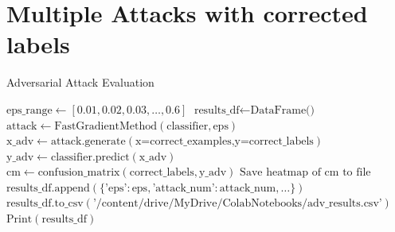 \documentclass[11pt,onside]{article}
\begin{document}
\section{Multiple Attacks with corrected labels}
\begin{algorithm}[H]
\caption{Adversarial Attack Evaluation}
\begin{algorithmic}[1]
\State $\text{eps\_range} \gets [0.01, 0.02, 0.03, \ldots, 0.6]$
\State $\text{results\_df} \gets \text{DataFrame()}$
        \State $\text{attack} \gets \text{FastGradientMethod}(\text{classifier}, \text{eps})$
        \State $\text{x\_adv} \gets \text{attack.generate}(\text{x=correct\_examples,y=correct\_labels})$
        \State $\text{y\_adv} \gets \text{classifier.predict}(\text{x\_adv})$
        \State $\text{cm} \gets \text{confusion\_matrix}(\text{correct\_labels}, \text{y\_adv})$
        \State $\text{Save heatmap of cm to file}$
        \State $\text{results\_df.append}(\{\text{'eps'}: \text{eps}, \text{'attack\_num'}: \text{attack\_num}, \ldots\})$
    \EndFor
\EndFor
\State $\text{results\_df.to\_csv}(\text{'/content/drive/MyDrive/ColabNotebooks/adv\_results.csv'})$
\State $\text{Print}(\text{results\_df})$
\end{algorithmic}
\end{algorithm}
\end{document}
